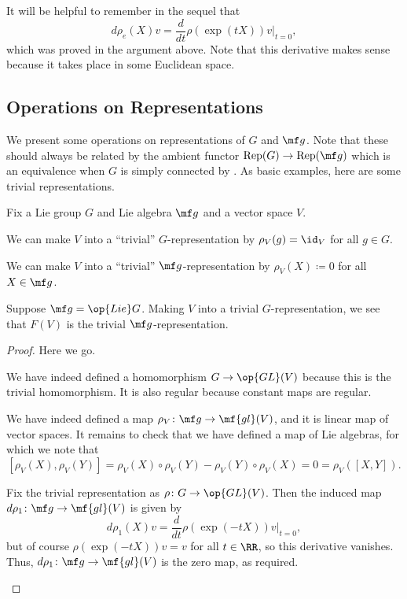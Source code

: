 \documentclass[../notes.tex]{subfiles}
\begin{document}
\begin{remark} \label{rem:induced-lie-alg-rep}
	It will be helpful to remember in the sequel that
	\[d\rho_e(X)v=\frac d{dt}\rho(\exp(tX))v\bigg|_{t=0},\]
	which was proved in the argument above. Note that this derivative makes sense because it takes place in some Euclidean space.
\end{remark}

\subsection{Operations on Representations}
We present some operations on representations of $G$ and $\mf g$. Note that these should always be related by the ambient functor $\mathrm{Rep}(G)\to\mathrm{Rep}(\mf g)$ which is an equivalence when $G$ is simply connected by . As basic examples, here are some trivial representations.
\begin{lemma}
	Fix a Lie group $G$ and Lie algebra $\mf g$ and a vector space $V$.
	\begin{listalph}
		\item We can make $V$ into a ``trivial'' $G$-representation by $\rho_V(g)=\id_V$ for all $g\in G$.
		\item We can make $V$ into a ``trivial'' $\mf g$-representation by $\rho_V(X)\coloneqq0$ for all $X\in\mf g$.
		\item Suppose $\mf g=\op{Lie}G$. Making $V$ into a trivial $G$-representation, we see that $F(V)$ is the trivial $\mf g$-representation.
	\end{listalph}
\end{lemma}
\begin{proof}
	Here we go.
	\begin{listalph}
		\item We have indeed defined a homomorphism $G\to\op{GL}(V)$ because this is the trivial homomorphism. It is also regular because constant maps are regular.
		\item We have indeed defined a map $\rho_V\colon\mf g\to\mf{gl}(V)$, and it is linear map of vector spaces. It remains to check that we have defined a map of Lie algebras, for which we note that
		\[[\rho_V(X),\rho_V(Y)]=\rho_V(X)\circ\rho_V(Y)-\rho_V(Y)\circ\rho_V(X)=0=\rho_V([X,Y]).\]
		\item Fix the trivial representation as $\rho\colon G\to\op{GL}(V)$. Then the induced map $d\rho_1\colon\mf g\to\mf{gl}(V)$ is given by
		\[d\rho_1(X)v=\frac d{dt}\rho(\exp(-tX))v\bigg|_{t=0},\]
		but of course $\rho(\exp(-tX))v=v$ for all $t\in\RR$, so this derivative vanishes. Thus, $d\rho_1\colon\mf g\to\mf{gl}(V)$ is the zero map, as required.
		\qedhere
	\end{listalph}
\end{proof}
\end{document}
